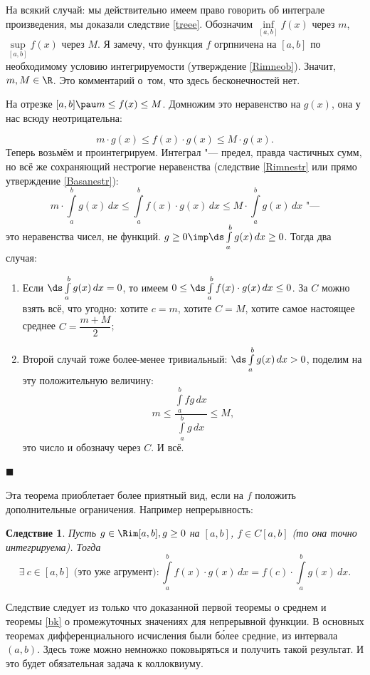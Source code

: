 \documentclass[a4paper,10pt,twoside]{article}
\newtheorem{Sl}{Следствие}[section]
\newenvironment{Proof}
       {\par\noindent{\textbf{Доказательство.}}}
       {\hfill$\scriptstyle\blacksquare$}
\begin{document}
 	\begin{Proof}
 	На всякий случай: мы действительно имеем право говорить об интеграле произведения, мы доказали следствие \ref{treee}.
 	Обозначим $\inf\limits_{[a,b]}f(x)$ через $m$, $\sup\limits_{[a,b]}f(x)$ через $M$. Я замечу, что функция $f$ огрпничена на $[a,b]$ по необходимому
 	условию интегрируемости (утверждение \ref{Rimneob}). Значит, $m,M\in\R$. Это комментарий о~том, что здесь бесконечностей нет.
 	
 	На отрезке $[a,b]\pau m\leq f(x)\leq M$. Домножим это неравенство на $g(x)$, она у нас всюду неотрицательна:
 	
 	$$m\cdot g(x)\leq f(x)\cdot g(x)\leq M\cdot g(x).$$
 	Теперь возьмём и проинтегрируем. Интеграл "--- предел, правда частичных сумм, но всё же сохраняющий
 	нестрогие неравенства (следствие \ref{Rimnestr} или прямо утверждение \ref{Basanestr}):
 	$$m\cdot\int\limits_a^bg(x)\,dx\leq\int\limits_a^bf(x)\cdot g(x)\,dx\leq M\cdot\int\limits_a^bg(x)\,dx\text{ "---}$$
 	это неравенства чисел, не функций. $g\geq0\imp \ds\int\limits_a^bg(x)\,dx\geq0$. Тогда два случая:
 	
 	\begin{enumerate}
 	  \item Если $\ds\int\limits_a^bg(x)\,dx=0$, то имеем $0\leq\ds\int\limits_a^bf(x)\cdot g(x)\,dx\leq 0$. За $C$ можно взять
 	  всё, что угодно: хотите $c=m$, хотите $C=M$, хотите самое настоящее среднее $C=\dfrac{m+M}2$;
 	  \item Второй случай тоже более-менее тривиальный: $\ds\int\limits_a^bg(x)\,dx>0$, поделим на эту положительную величину:
 	  $$m\leq\dfrac{\int\limits_a^bf g\,dx}{\int\limits_a^bg\,dx}\leq M,$$
 	  это число и обозначу через $C$. И всё.
 	\end{enumerate}
 	\end{Proof}
 	
 	Эта теорема приоблетает более приятный вид, если на $f$ положить дополнительные ограничения. Например непрерывность:
 	
 	\begin{Sl}
 		Пусть $g\in\Rim[a,b],g\geq0$ на $[a,b]$, $f\in C[a,b]$ (то она точно интегрируема). Тогда
 		$$\exists\  c\in[a,b]\text{ (это уже агрумент)}\colon\int\limits_a^bf(x)\cdot g(x)\,dx=f(c)\cdot\int\limits_a^bg(x)\,dx.$$
 	\end{Sl}
 	
 	Следствие следует из только что доказанной первой теоремы о среднем и теоремы \ref{bk} о промежуточных значениях для непрерывной функции.
 	В основных теоремах дифференциального исчисления были б\'{о}лее средние, из интервала $(a,b)$. Здесь тоже можно немножко поковыряться и 
 	получить такой результат. И это будет обязательная задача к коллоквиуму.
 	
\end{document}
